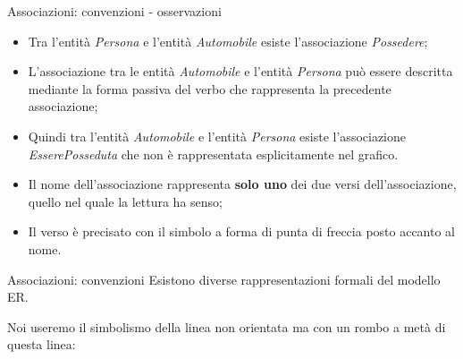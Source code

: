 \begin{frame}{Associazioni: convenzioni - osservazioni}
\begin{center}
\end{center}
\begin{itemize}[<+->]
    \item Tra l'entit\`a \textit{Persona} e l'entit\`a \textit{Automobile} esiste l'associazione \textit{Possedere};
    \item L'associazione tra le entit\`a \textit{Automobile} e l'entit\`a \textit{Persona} pu\`o essere descritta mediante la forma passiva del verbo che rappresenta la precedente associazione;
    \item Quindi tra l'entit\`a \textit{Automobile} e l'entit\`a \textit{Persona} esiste l'associazione \textit{EsserePosseduta} che non \`e rappresentata esplicitamente nel grafico.
    \item Il nome dell'associazione rappresenta \textbf{solo uno} dei due versi dell'associazione, quello nel quale la lettura ha senso;
    \item Il verso \`e precisato con il simbolo a forma di punta di freccia posto accanto al nome.
\end{itemize}
\end{frame}
%
\begin{frame}{Associazioni: convenzioni}
Esistono diverse rappresentazioni formali del modello ER.

Noi useremo il simbolismo della linea non orientata ma con un rombo a met\`a di questa linea:
\begin{center}
\end{center}
\end{frame}
